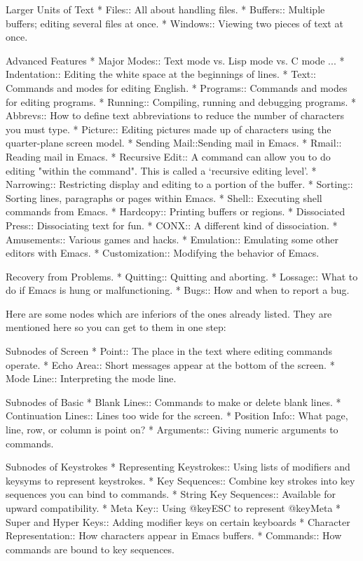 Larger Units of Text
* Files::       All about handling files.
* Buffers::     Multiple buffers; editing several files at once.
* Windows::     Viewing two pieces of text at once.

Advanced Features
* Major Modes:: Text mode vs. Lisp mode vs. C mode ...
* Indentation:: Editing the white space at the beginnings of lines.
* Text::        Commands and modes for editing English.
* Programs::    Commands and modes for editing programs.
* Running::     Compiling, running and debugging programs.
* Abbrevs::     How to define text abbreviations to reduce
                 the number of characters you must type.
* Picture::     Editing pictures made up of characters
                 using the quarter-plane screen model.
* Sending Mail::Sending mail in Emacs.
* Rmail::       Reading mail in Emacs.
* Recursive Edit::
                A command can allow you to do editing
                 "within the command".  This is called a
                 `recursive editing level'.
* Narrowing::   Restricting display and editing to a portion
                 of the buffer.
* Sorting::	Sorting lines, paragraphs or pages within Emacs.
* Shell::       Executing shell commands from Emacs.
* Hardcopy::	Printing buffers or regions.
* Dissociated Press::  Dissociating text for fun.
* CONX::	       A different kind of dissociation.
* Amusements::         Various games and hacks.
* Emulation::	       Emulating some other editors with Emacs.
* Customization::      Modifying the behavior of Emacs.

Recovery from Problems.
* Quitting::    Quitting and aborting.
* Lossage::     What to do if Emacs is hung or malfunctioning.
* Bugs::        How and when to report a bug.

Here are some nodes which are inferiors of the ones already listed. They
are mentioned here so you can get to them in one step:

Subnodes of Screen
* Point::	The place in the text where editing commands operate.
* Echo Area::   Short messages appear at the bottom of the screen.
* Mode Line::	Interpreting the mode line.

Subnodes of Basic
* Blank Lines:: Commands to make or delete blank lines.
* Continuation Lines:: Lines too wide for the screen.
* Position Info::      What page, line, row, or column is point on?
* Arguments::          Giving numeric arguments to commands.

Subnodes of Keystrokes
* Representing Keystrokes::  Using lists of modifiers and keysyms to
                             represent keystrokes.
* Key Sequences::            Combine key strokes into key sequences you can
                             bind to commands.
* String Key Sequences::     Available for upward compatibility.
* Meta Key::                 Using @key{ESC} to represent @key{Meta}
* Super and Hyper Keys::     Adding modifier keys on certain keyboards
* Character Representation:: How characters appear in Emacs buffers.
* Commands::                 How commands are bound to key sequences.
                    
